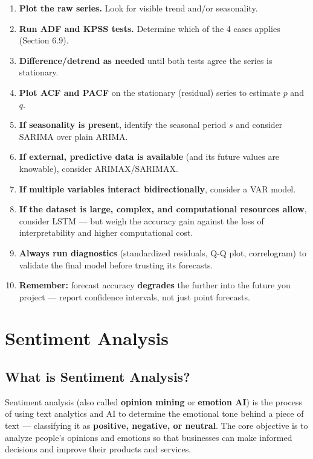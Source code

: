 \documentclass[12pt,openany]{book}
\begin{document}
\begin{enumerate}[leftmargin=*]
    \item \textbf{Plot the raw series.} Look for visible trend and/or seasonality.
    \item \textbf{Run ADF and KPSS tests.} Determine which of the 4 cases applies (Section 6.9).
    \item \textbf{Difference/detrend as needed} until both tests agree the series is stationary.
    \item \textbf{Plot ACF and PACF} on the stationary (residual) series to estimate \(p\) and \(q\).
    \item \textbf{If seasonality is present}, identify the seasonal period \(s\) and consider SARIMA over plain ARIMA.
    \item \textbf{If external, predictive data is available} (and its future values are knowable), consider ARIMAX/SARIMAX.
    \item \textbf{If multiple variables interact bidirectionally}, consider a VAR model.
    \item \textbf{If the dataset is large, complex, and computational resources allow}, consider LSTM --- but weigh the accuracy gain against the loss of interpretability and higher computational cost.
    \item \textbf{Always run diagnostics} (standardized residuals, Q-Q plot, correlogram) to validate the final model before trusting its forecasts.
    \item \textbf{Remember:} forecast accuracy \textbf{degrades} the further into the future you project --- report confidence intervals, not just point forecasts.
\end{enumerate}

\section{Sentiment Analysis}


\subsection{What is Sentiment Analysis?}

Sentiment analysis (also called \textbf{opinion mining} or \textbf{emotion AI}) is the process of using text analytics and AI to determine the emotional tone behind a piece of text --- classifying it as \textbf{positive, negative, or neutral}. The core objective is to analyze people's opinions and emotions so that businesses can make informed decisions and improve their products and services.
\end{document}
